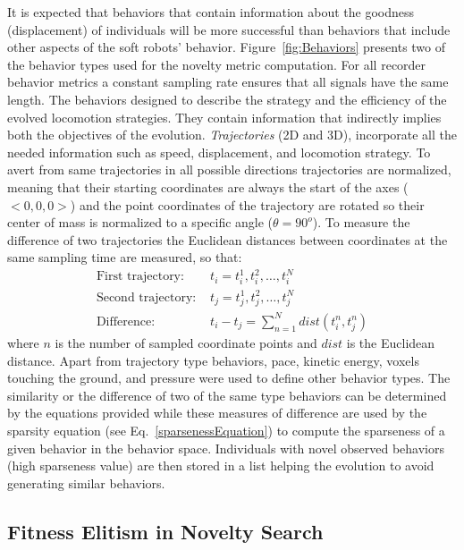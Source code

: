\documentclass{sig-alternate}
\begin{document}
It is expected that behaviors that contain information about the goodness (displacement) of individuals will be more successful than behaviors that include other aspects of the soft robots' behavior. Figure~\ref{fig:Behaviors} presents two of the behavior types used for the novelty metric computation. For all recorder behavior metrics a constant sampling rate ensures that all signals have the same length. The behaviors designed to describe the strategy and the efficiency of the evolved locomotion strategies. They contain information that indirectly implies both the objectives of the evolution. \emph{Trajectories} (2D and 3D), incorporate all the needed information such as speed, displacement, and locomotion strategy. To avert from same trajectories in all possible directions trajectories are normalized, meaning that their starting coordinates are always the start of the axes ($<0,0,0>$) and the point coordinates of the trajectory are rotated so their center of mass is normalized to a specific angle ($\theta = 90^{o}$). To measure the difference of two trajectories the Euclidean distances between coordinates at the same sampling time are measured, so that:
\begin{align}
\text{First trajectory: } &t_i = t_i^1, t_i^2, \ldots, t_i^N\\
\text{Second trajectory: } &t_j = t_j^1, t_j^2, \ldots, t_j^N\\
\text{Difference: } &t_i - t_j = \sum_{n=1}^{N} dist( t_i^n, t_j^n )
\end{align}
where $n$ is the number of sampled coordinate points and $dist$ is the Euclidean distance. Apart from trajectory type behaviors, pace, kinetic energy, voxels touching the ground, and pressure were used to define other behavior types. The similarity or the difference of two of the same type behaviors can be determined by the equations provided while these measures of difference are used by the sparsity equation (see Eq.~\ref{sparsenessEquation}) to compute the sparseness of a given behavior in the behavior space. Individuals with novel observed behaviors (high sparseness value) are then stored in a list helping the evolution to avoid generating similar behaviors.


\subsection{Fitness Elitism in Novelty Search}
\end{document}
